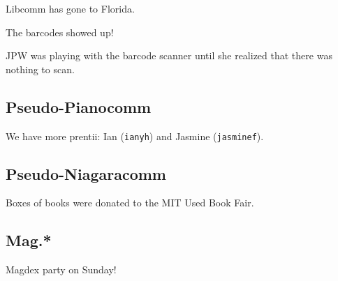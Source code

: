 \documentclass[10pt]{article}
\begin{document}
Libcomm has gone to Florida.

The barcodes showed up!

JPW was playing with the barcode scanner until she realized that there was nothing to scan.

\subsection*{Pseudo-Pianocomm}

We have more prentii: Ian (\texttt{ianyh}) and Jasmine (\texttt{jasminef}).

\subsection*{Pseudo-Niagaracomm}

Boxes of books were donated to the MIT Used Book Fair.

\subsection*{Mag.*}

Magdex party on Sunday!






\end{document}
